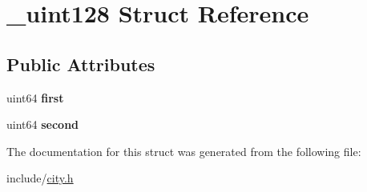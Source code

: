 \hypertarget{struct__uint128}{}\section{\+\_\+uint128 Struct Reference}
\label{struct__uint128}
\subsection*{Public Attributes}
\begin{DoxyCompactItemize}
\item 
\mbox{\label{struct__uint128_a3dbe253442b64a2b687a6dec18a4228a}} 
uint64 {\bfseries first}
\item 
\mbox{\label{struct__uint128_af6bc6891fe0f6485d2e93c1f293c0af5}} 
uint64 {\bfseries second}
\end{DoxyCompactItemize}


The documentation for this struct was generated from the following file\+:\begin{DoxyCompactItemize}
\item 
include/\mbox{\hyperlink{city_8h}{city.\+h}}\end{DoxyCompactItemize}
